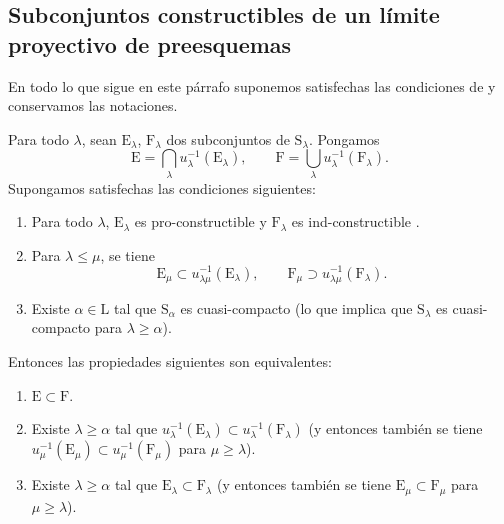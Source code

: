 \subsection{Subconjuntos constructibles de un límite proyectivo de preesquemas}
\label{subsection:IV.8.3}

\begin{env}[8.3.1]
\label{IV.8.3.1}
En todo lo que sigue en este párrafo suponemos satisfechas las condiciones de  y conservamos las notaciones.
\end{env}

\begin{theorem}[8.3.2]
\label{IV.8.3.2}
Para todo $\lambda$, sean $\mathrm{E}_\lambda$, $\mathrm{F}_\lambda$ dos subconjuntos de $\mathrm{S}_\lambda$.
Pongamos
\begin{equation}
  \mathrm{E}=\bigcap_\lambda u_\lambda^{-1}(\mathrm{E}_\lambda),\qquad \mathrm{F}=\bigcup_\lambda u_\lambda^{-1}(\mathrm{F}_\lambda).
  \tag{8.3.2.1}
\label{IV.8.3.2.1}
\end{equation}
Supongamos satisfechas las condiciones siguientes:
\begin{enumerate}[label=(\roman*)]
   \item Para todo $\lambda$, $\mathrm{E}_\lambda$ es pro-constructible y $\mathrm{F}_\lambda$ es ind-constructible .
   \item Para $\lambda\leqslant\mu$, se tiene
  \[
    \mathrm{E}_\mu\subset u_{\lambda\mu}^{-1}(\mathrm{E}_\lambda),\qquad \mathrm{F}_\mu\supset u_{\lambda\mu}^{-1}(\mathrm{F}_\lambda).
  \]
   \item Existe $\alpha\in\mathrm{L}$ tal que $\mathrm{S}_\alpha$ es cuasi-compacto (lo que implica que $\mathrm{S}_\lambda$ es cuasi-compacto para $\lambda\geqslant\alpha$).
\end{enumerate}
Entonces las propiedades siguientes son equivalentes:
\begin{enumerate}[label=\emph{\alph*)}]
   \item $\mathrm{E}\subset\mathrm{F}$.
   \item Existe $\lambda\geqslant\alpha$ tal que $u_\lambda^{-1}(\mathrm{E}_\lambda)\subset u_\lambda^{-1}(\mathrm{F}_\lambda)$ (y entonces también se tiene $u_\mu^{-1}(\mathrm{E}_\mu)\subset u_\mu^{-1}(\mathrm{F}_\mu)$ para
$\mu\geqslant\lambda$).
   \item Existe $\lambda\geqslant\alpha$ tal que $\mathrm{E}_\lambda\subset\mathrm{F}_\lambda$ (y entonces también se tiene $\mathrm{E}_\mu\subset\mathrm{F}_\mu$ para $\mu\geqslant\lambda$).

\end{enumerate}
\end{theorem}
